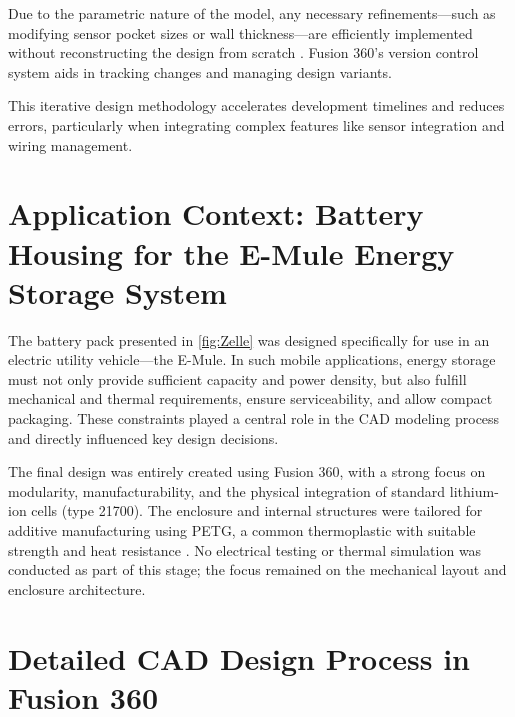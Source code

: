 Due to the parametric nature of the model, any necessary refinements—such as modifying sensor pocket sizes or wall thickness—are efficiently implemented without reconstructing the design from scratch \cite{hogan2025}. Fusion 360’s version control system aids in tracking changes and managing design variants.

This iterative design methodology accelerates development timelines and reduces errors, particularly when integrating complex features like sensor integration and wiring management.



\section{Application Context: Battery Housing for the E-Mule Energy Storage System}

\addtocounter{page}{1} %

The battery pack presented in \ref{fig:Zelle}  was designed specifically for use in an electric utility vehicle—the E-Mule. In such mobile applications, energy storage must not only provide sufficient capacity and power density, but also fulfill mechanical and thermal requirements, ensure serviceability, and allow compact packaging. These constraints played a central role in the CAD modeling process and directly influenced key design decisions.

The final design was entirely created using Fusion 360, with a strong focus on modularity, manufacturability, and the physical integration of standard lithium-ion cells (type 21700). The enclosure and internal structures were tailored for additive manufacturing using PETG, a common thermoplastic with suitable strength and heat resistance \cite{gebhardt2016}. No electrical testing or thermal simulation was conducted as part of this stage; the focus remained on the mechanical layout and enclosure architecture.

\section{Detailed CAD Design Process in Fusion 360}

